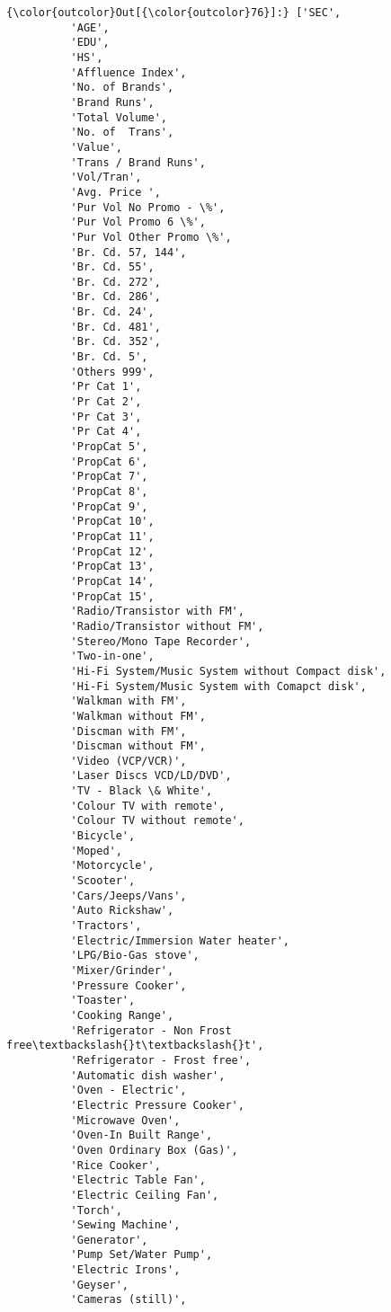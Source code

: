 \documentclass[11pt]{article}
\begin{document}
\begin{Verbatim}[commandchars=\\\{\}]
{\color{outcolor}Out[{\color{outcolor}76}]:} ['SEC',
          'AGE',
          'EDU',
          'HS',
          'Affluence Index',
          'No. of Brands',
          'Brand Runs',
          'Total Volume',
          'No. of  Trans',
          'Value',
          'Trans / Brand Runs',
          'Vol/Tran',
          'Avg. Price ',
          'Pur Vol No Promo - \%',
          'Pur Vol Promo 6 \%',
          'Pur Vol Other Promo \%',
          'Br. Cd. 57, 144',
          'Br. Cd. 55',
          'Br. Cd. 272',
          'Br. Cd. 286',
          'Br. Cd. 24',
          'Br. Cd. 481',
          'Br. Cd. 352',
          'Br. Cd. 5',
          'Others 999',
          'Pr Cat 1',
          'Pr Cat 2',
          'Pr Cat 3',
          'Pr Cat 4',
          'PropCat 5',
          'PropCat 6',
          'PropCat 7',
          'PropCat 8',
          'PropCat 9',
          'PropCat 10',
          'PropCat 11',
          'PropCat 12',
          'PropCat 13',
          'PropCat 14',
          'PropCat 15',
          'Radio/Transistor with FM',
          'Radio/Transistor without FM',
          'Stereo/Mono Tape Recorder',
          'Two-in-one',
          'Hi-Fi System/Music System without Compact disk',
          'Hi-Fi System/Music System with Comapct disk',
          'Walkman with FM',
          'Walkman without FM',
          'Discman with FM',
          'Discman without FM',
          'Video (VCP/VCR)',
          'Laser Discs VCD/LD/DVD',
          'TV - Black \& White',
          'Colour TV with remote',
          'Colour TV without remote',
          'Bicycle',
          'Moped',
          'Motorcycle',
          'Scooter',
          'Cars/Jeeps/Vans',
          'Auto Rickshaw',
          'Tractors',
          'Electric/Immersion Water heater',
          'LPG/Bio-Gas stove',
          'Mixer/Grinder',
          'Pressure Cooker',
          'Toaster',
          'Cooking Range',
          'Refrigerator - Non Frost free\textbackslash{}t\textbackslash{}t',
          'Refrigerator - Frost free',
          'Automatic dish washer',
          'Oven - Electric',
          'Electric Pressure Cooker',
          'Microwave Oven',
          'Oven-In Built Range',
          'Oven Ordinary Box (Gas)',
          'Rice Cooker',
          'Electric Table Fan',
          'Electric Ceiling Fan',
          'Torch',
          'Sewing Machine',
          'Generator',
          'Pump Set/Water Pump',
          'Electric Irons',
          'Geyser',
          'Cameras (still)',

\end{Verbatim}
\end{document}
